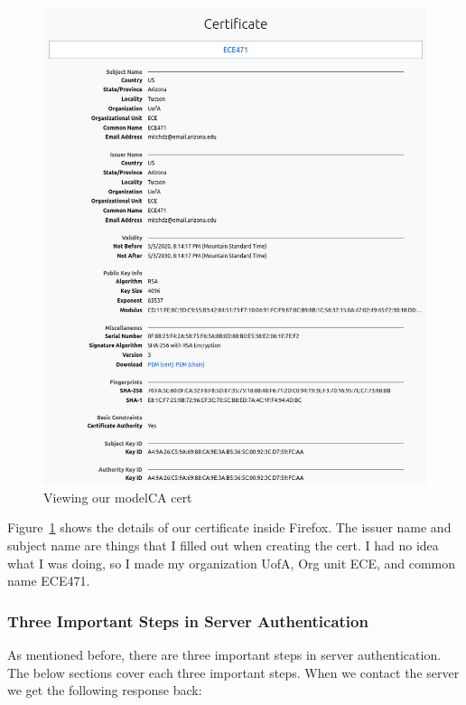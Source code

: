 \documentclass[12pt]{article}
\begin{document}
    
    \begin{figure}[H]
        \begin{center}
            \includegraphics[scale=0.5]{t4_7.png}
        \end{center}{}
        \caption{Viewing our modelCA cert}
        \label{fig:t4_7}
    \end{figure}

Figure~\ref{fig:t4_7} shows the details of our certificate inside Firefox. The issuer name and subject name are things that I filled out when creating the cert. I had no idea what I was doing, so I made my organization UofA, Org unit ECE, and common name ECE471.


\subsubsection{Three Important Steps in Server Authentication}
As mentioned before, there are three important steps in server authentication. The below sections cover each three important steps. When we contact the server we get the following response back:
\end{document}

